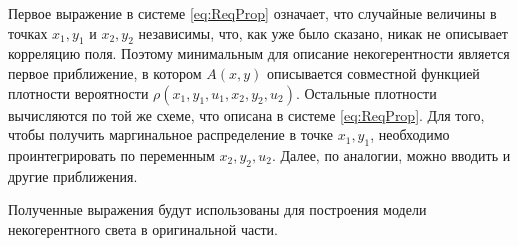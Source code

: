 Первое выражение в системе \ref{eq:ReqProp} означает, что случайные величины в точках $x_1,y_1$ и $x_2,y_2$ независимы, что, как уже было сказано, никак не описывает корреляцию поля. Поэтому минимальным для описание некогерентности является первое приближение, в котором $A(x,y)$ описывается совместной функцией плотности вероятности $\rho(x_1,y_1,u_1,x_2,y_2,u_2)$. Остальные плотности вычисляются по той же схеме, что описана в системе \ref{eq:ReqProp}. Для того, чтобы получить маргинальное распределение в точке $x_1,y_1$, необходимо проинтегрировать по переменным $x_2,y_2,u_2$. Далее, по аналогии, можно вводить и другие приближения.
\par
Полученные выражения будут использованы для построения модели некогерентного света в оригинальной части.
